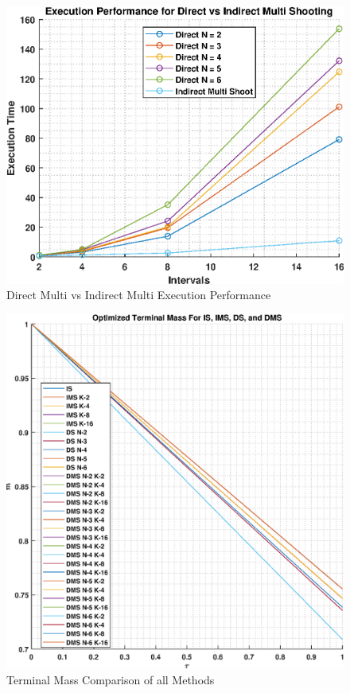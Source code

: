 \documentclass[]{article}
\begin{document}
\begin{figure}
	\centering
	\includegraphics[scale=0.75]{DirectVsIndireMulti.eps}
	\caption{Direct Multi vs Indirect Multi Execution Performance}
	\label{fig:DirectVsIndirectMulti}
\end{figure}
\begin{figure}
	\centering
	\includegraphics[scale=0.50]{terminlMassCompare.eps}
	\caption{Terminal Mass Comparison of all Methods}
	\label{fig:terminlMassCompare}
\end{figure}
\end{document}
